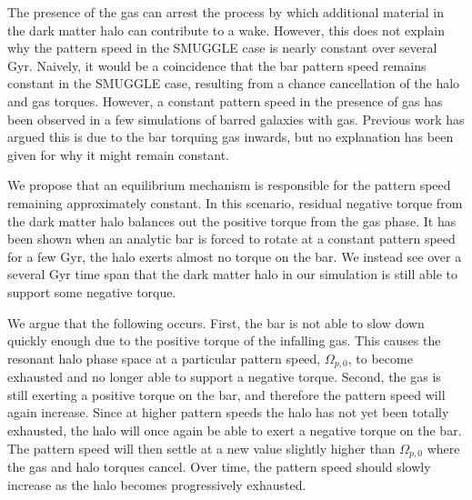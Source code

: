 \documentclass[twoside]{natureprintstyle}
\begin{document}
The presence of the gas can arrest the process by which additional material in
the dark matter halo can contribute to a wake. However, this does not explain
why the pattern speed in the SMUGGLE case is nearly constant over several Gyr.
Naively, it would be a coincidence that the bar pattern speed remains constant
in the SMUGGLE case, resulting from a chance cancellation of the halo and gas
torques. However, a constant pattern speed in the presence of gas has been
observed in a few simulations of barred galaxies with
gas.\cite{1993AA...268...65F, 2010ApJ...719.1470V} Previous work has argued
this is due to the bar torquing gas inwards, but no explanation has been given
for why it might remain constant.

We propose that an equilibrium mechanism is responsible for the pattern speed
remaining approximately constant. In this scenario, residual negative torque
from the dark matter halo balances out the positive torque from the gas phase.
It has been shown when an analytic bar is forced to rotate at a constant
pattern speed for a few Gyr, the halo exerts almost no torque on the
bar.\cite{2022MNRAS.513..768C} We instead see over a several Gyr time span
that the dark matter halo in our simulation is still able to support some
negative torque.

We argue that the following occurs. First, the bar is not able to slow down
quickly enough due to the positive torque of the infalling gas. This causes
the resonant halo phase space at a particular pattern speed, $\Omega_{p,0}$,
to become exhausted and no longer able to support a negative torque. Second,
the gas is still exerting a positive torque on the bar, and therefore the
pattern speed will again increase. Since at higher pattern speeds the halo has
not yet been totally exhausted, the halo will once again be able to exert a
negative torque on the bar. The pattern speed will then settle at a new value
slightly higher than $\Omega_{p,0}$ where the gas and halo torques cancel.
Over time, the pattern speed should slowly increase as the halo becomes
progressively exhausted.
\end{document}
